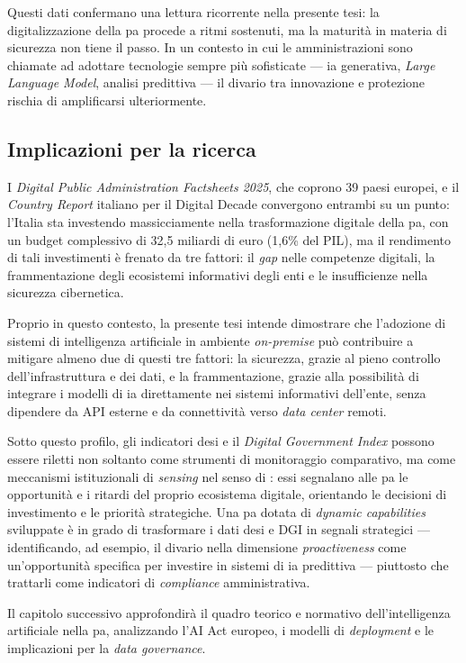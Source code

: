 Questi dati confermano una lettura ricorrente nella presente tesi: la digitalizzazione della \gls{pa} procede a ritmi sostenuti, ma la maturità in materia di sicurezza non tiene il passo. In un contesto in cui le amministrazioni sono chiamate ad adottare tecnologie sempre più sofisticate --- \gls{ia} generativa, \textit{Large Language Model}, analisi predittiva --- il divario tra innovazione e protezione rischia di amplificarsi ulteriormente.

\subsection{Implicazioni per la ricerca}

I \textit{Digital Public Administration Factsheets 2025}, che coprono 39 paesi europei, e il \textit{Country Report} italiano per il Digital Decade convergono entrambi \parencite{DigitalPAFactsheets2025,ItalyDigitalDecade2025} su un punto: l'Italia sta investendo massicciamente nella trasformazione digitale della \gls{pa}, con un budget complessivo di 32,5 miliardi di euro (1,6\% del PIL), ma il rendimento di tali investimenti è frenato da tre fattori: il \textit{gap} nelle competenze digitali, la frammentazione degli ecosistemi informativi degli enti e le insufficienze nella sicurezza cibernetica.

Proprio in questo contesto, la presente tesi intende dimostrare che l'adozione di sistemi di intelligenza artificiale in ambiente \textit{on-premise} può contribuire a mitigare almeno due di questi tre fattori: la sicurezza, grazie al pieno controllo dell'infrastruttura e dei dati, e la frammentazione, grazie alla possibilità di integrare i modelli di \gls{ia} direttamente nei sistemi informativi dell'ente, senza dipendere da API esterne e da connettività verso \textit{data center} remoti.

Sotto questo profilo, gli indicatori \gls{desi} e il \textit{Digital Government Index} possono essere riletti non soltanto come strumenti di monitoraggio comparativo, ma come meccanismi istituzionali di \textit{sensing} nel senso di \textcite{Teece2007}: essi segnalano alle \gls{pa} le opportunità e i ritardi del proprio ecosistema digitale, orientando le decisioni di investimento e le priorità strategiche. Una \gls{pa} dotata di \textit{dynamic capabilities} sviluppate è in grado di trasformare i dati \gls{desi} e DGI in segnali strategici --- identificando, ad esempio, il divario nella dimensione \textit{proactiveness} come un'opportunità specifica per investire in sistemi di \gls{ia} predittiva --- piuttosto che trattarli come indicatori di \textit{compliance} amministrativa.

Il capitolo successivo approfondirà il quadro teorico e normativo dell'intelligenza artificiale nella \gls{pa}, analizzando l'AI Act europeo, i modelli di \textit{deployment} e le implicazioni per la \textit{data governance}.
